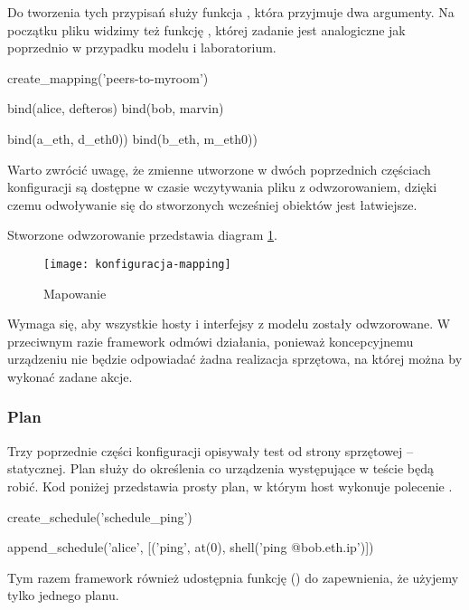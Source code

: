 \documentclass[00-praca-magisterska.tex]{subfiles}
\begin{document}
Do tworzenia tych przypisań służy funkcja , która przyjmuje dwa
argumenty. Na początku pliku widzimy też funkcję , której
zadanie jest analogiczne jak poprzednio w przypadku modelu i laboratorium.

\begin{pythoncode}
  create_mapping('peers-to-myroom')

  bind(alice, defteros)
  bind(bob,   marvin)

  bind(a_eth, d_eth0))
  bind(b_eth, m_eth0))
\end{pythoncode}

Warto zwrócić uwagę, że zmienne utworzone w dwóch poprzednich częściach
konfiguracji są dostępne w czasie wczytywania pliku z odwzorowaniem, dzięki czemu
odwoływanie się do stworzonych wcześniej obiektów jest łatwiejsze.

Stworzone odwzorowanie przedstawia diagram \ref{fig:konfiguracja-mapping}.

\begin{figure}[htb]
\begin{center}
\leavevmode
\texttt{[image: konfiguracja-mapping]}
\end{center}
\caption{Mapowanie}
\label{fig:konfiguracja-mapping}
\end{figure}

Wymaga się, aby wszystkie hosty i interfejsy z modelu zostały odwzorowane. W
przeciwnym razie framework odmówi działania, ponieważ koncepcyjnemu urządzeniu
nie będzie odpowiadać żadna realizacja sprzętowa, na której można by wykonać
zadane akcje.

\subsubsection{Plan}

Trzy poprzednie części konfiguracji opisywały test od strony sprzętowej --
statycznej. Plan służy do określenia co urządzenia występujące w teście będą
robić. Kod poniżej przedstawia prosty plan, w którym host wykonuje polecenie
.

\begin{pythoncode}
  create_schedule('schedule_ping')

  append_schedule('alice', [('ping', at(0), shell('ping @{bob.eth.ip}')])
\end{pythoncode}

Tym razem framework również udostępnia funkcję () do
zapewnienia, że użyjemy tylko jednego planu.
\end{document}
